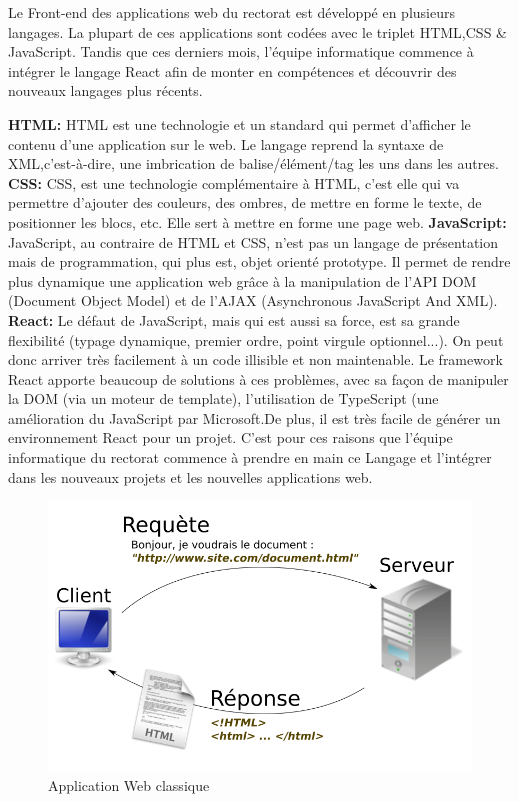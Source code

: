 \documentclass[12pt]{article}
\begin{document}
Le Front-end des applications web du rectorat est développé en plusieurs langages. La plupart de ces applications  sont codées avec le triplet HTML,CSS \& JavaScript. Tandis que ces derniers mois, l'équipe informatique commence à intégrer le langage React  afin de monter en compétences et découvrir des nouveaux langages plus récents.

\textbf{HTML:} HTML est une technologie et un standard qui permet d'afficher le contenu d'une application sur le web. Le langage reprend la syntaxe de XML,c'est-à-dire, une imbrication de balise/élément/tag les uns dans les autres. \newline
\newline
\textbf{CSS:} CSS, est une technologie complémentaire à HTML, c'est elle qui va permettre d'ajouter des couleurs, des ombres, de mettre en forme le texte, de positionner les blocs, etc. Elle sert à mettre en forme une page web. \newline
\newline
\textbf{JavaScript:} JavaScript, au contraire de HTML et CSS, n'est pas un langage de présentation mais de programmation, qui plus est, objet orienté prototype. Il permet de rendre plus dynamique une application web grâce à la manipulation de l'API DOM (Document Object Model) et de l'AJAX (Asynchronous JavaScript And XML).\newline
\newline
\textbf{React:} Le défaut de JavaScript, mais qui est aussi sa force, est sa grande flexibilité (typage dynamique, premier ordre, point virgule optionnel...). On peut donc arriver très facilement à un code illisible et non maintenable. Le framework React apporte beaucoup de solutions à ces problèmes, avec sa façon de manipuler la DOM (via un moteur de template), l'utilisation de TypeScript (une amélioration du JavaScript par Microsoft.De plus, il est très facile de générer un environnement React pour un projet. C'est pour ces raisons que l'équipe informatique du rectorat commence à prendre en main ce Langage et l’intégrer dans les nouveaux projets et les nouvelles applications web.

\begin{figure}[H]
	\centering
 		\includegraphics[width=1\textwidth]{diagrammes/schema-serveur.png}
  		\caption{Application Web classique}
	\end{figure}
\end{document}
